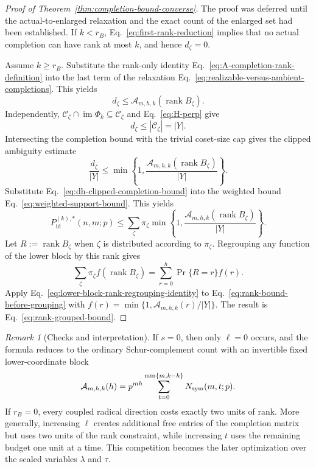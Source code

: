 \documentclass[11pt]{article}
\newcommand{\rank}{\operatorname{rank}}
\newcommand{\1}{\mathbf 1}
\theoremstyle{plain}
\theoremstyle{definition}
\theoremstyle{remark}
\newtheorem{remark}[theorem]{Remark}
\begin{document}
\begin{proof}[Proof of Theorem~\ref{thm:completion-bound-converse}]
The proof was deferred until the actual-to-enlarged relaxation and the exact
count of the enlarged set had been established.  If
$k<r_B$, Eq.~\eqref{eq:first-rank-reduction} implies that no actual
completion can have rank at most $k$, and hence $d_{\zeta}=0$.

Assume $k\ge r_B$.  Substitute the rank-only identity
Eq.~\eqref{eq:A-completion-rank-definition} into the last term of the
relaxation Eq.~\eqref{eq:realizable-versus-ambient-completions}.  This yields
\begin{equation}
 d_{\zeta}
 \le\mathcal A_{m,h,k}(\rank B_{\zeta}).
 \label{eq:dh-completion-bound}
\end{equation}
Independently,
$\mathcal C_{\zeta}\cap\operatorname{im}\Phi_k\subseteq\mathcal C_{\zeta}$
and Eq.~\eqref{eq:H-perp} give
\begin{equation}
 d_{\zeta}\le|\mathcal C_{\zeta}|=\lvert Y\rvert.
 \label{eq:dh-trivial-visible-cap}
\end{equation}
Intersecting the completion bound with the trivial coset-size cap gives the
clipped ambiguity estimate
\begin{equation}
 \frac{d_{\zeta}}{\lvert Y\rvert}
 \le\min\left\{1,
 \frac{\mathcal A_{m,h,k}(\rank B_{\zeta})}{\lvert Y\rvert}\right\}.
 \label{eq:dh-clipped-completion-bound}
\end{equation}
Substitute Eq.~\eqref{eq:dh-clipped-completion-bound} into the weighted bound
Eq.~\eqref{eq:weighted-support-bound}.  This yields
\begin{equation}
 P_{\mathrm{id}}^{(k),*}(n,m;p)
 \le\sum_{\zeta}\pi_{\zeta}
 \min\left\{1,
 \frac{\mathcal A_{m,h,k}(\rank B_{\zeta})}{\lvert Y\rvert}\right\}.
 \label{eq:rank-bound-before-grouping}
\end{equation}
Let $R:=\rank B_{\zeta}$ when $\zeta$ is distributed according to
$\pi_{\zeta}$.  Regrouping any function of the lower block by this rank gives
\begin{equation}
 \sum_{\zeta}\pi_{\zeta}f(\rank B_{\zeta})
 =\sum_{r=0}^{h}\Pr\{R=r\}f(r).
 \label{eq:lower-block-rank-regrouping-identity}
\end{equation}
Apply Eq.~\eqref{eq:lower-block-rank-regrouping-identity} to
Eq.~\eqref{eq:rank-bound-before-grouping} with
$f(r)=\min\{1,\mathcal A_{m,h,k}(r)/\lvert Y\rvert\}$.  The result is
Eq.~\eqref{eq:rank-grouped-bound}.
\end{proof}
\begin{remark}[Checks and interpretation]
If $s=0$, then only $\ell=0$ occurs, and the formula reduces to the ordinary Schur-complement count with an invertible fixed lower-coordinate block
\[
 \mathcal A_{m,h,k}(h)=p^{mh}
 \sum_{t=0}^{\min\{m,k-h\}}N_{\rm sym}(m,t;p).
\]
If $r_B=0$, every coupled radical direction costs exactly two units of rank.
More generally, increasing $\ell$ creates additional free entries of the completion matrix but
uses two units of the rank constraint, while increasing $t$ uses the remaining
budget one unit at a time.  This competition becomes the later optimization
over the scaled variables $\lambda$ and $\tau$.
\end{remark}
\end{document}
